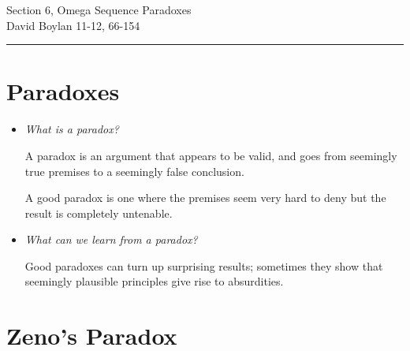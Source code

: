 \documentclass[justified]{tufte-handout}
\newcommand{\HRule}{\rule{\linewidth}{0.1mm}}
\begin{document}
\frenchspacing

\begin{fullwidth}
\noindent\Large Section 6,  Omega Sequence Paradoxes \large \\[.3cm]
\noindent  David Boylan \hfill{11-12, 66-154}

\noindent\HRule
\end{fullwidth}


\section{Paradoxes}

\begin{itemize}


\item \emph{What is a paradox?}

A paradox is an argument that appears to be valid, and goes from seemingly true premises to a seemingly false conclusion.

A good paradox is one where the premises seem very hard to deny but the result is completely untenable.


\item \emph{What can we learn from a paradox?}

Good paradoxes can turn up surprising results; sometimes they show that seemingly plausible principles give rise to absurdities.

\end{itemize}


\section{Zeno's Paradox}
\end{document}

